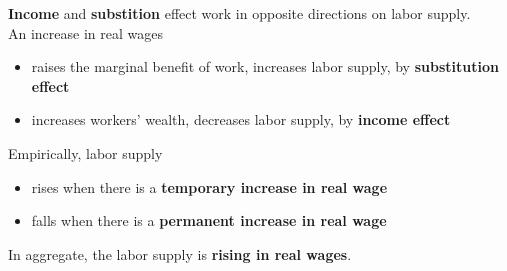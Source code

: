 \begin{remark} 
    \textbf{Income} and \textbf{substition} effect work in opposite directions on labor supply.  \\

    An increase in real wages 
    \begin{itemize}
        \item raises the marginal benefit of work, increases labor supply, by \textbf{substitution effect}
        \item increases workers' wealth, decreases labor supply, by \textbf{income effect}
    \end{itemize}   
\end{remark}


\begin{remark}
    Empirically, labor supply 
    \begin{itemize}
        \item rises when there is a \textbf{temporary increase in real wage}
        \item falls when there is a \textbf{permanent increase in real wage}
    \end{itemize} 

    In aggregate, the labor supply is \textbf{rising in real wages}.

\begin{center}
\end{center}
\end{remark}

